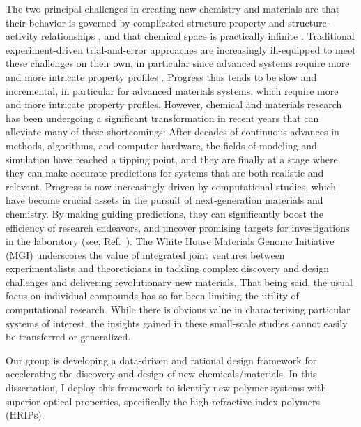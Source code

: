 The two principal challenges in creating new chemistry and materials are that their behavior is governed by complicated structure-property and structure-activity relationships \cite{Selassie2003,Muller2005,LeBaillydeTilleghem2007}, and that chemical space is practically infinite \cite{Lipinski2004,Kirkpatrick2004,Dobson2004}. 
Traditional experiment-driven trial-and-error approaches are increasingly ill-equipped to meet these challenges on their own, in particular since advanced systems require more and more intricate property profiles \cite{Zvinavashe2008,Scior:2009-11,Schneider2010}. 
Progress thus tends to be slow and incremental, in particular for advanced materials systems, which require more and more intricate property profiles. However, chemical and materials research has been undergoing a significant transformation in recent years that can alleviate many of these shortcomings: After decades of continuous advances in methods, algorithms, and computer hardware, the fields of modeling and simulation have reached a tipping point, and they are finally at a stage where they can make accurate predictions for systems that are both realistic and relevant. Progress is now increasingly driven by computational studies, which have become crucial assets in the pursuit of next-generation materials and chemistry. By making guiding predictions, they can significantly boost the efficiency of research endeavors, and uncover promising targets for investigations in the laboratory (see, \eg  Ref.\ \cite{cep01,Sokolov2011,Hachmann2011,Olivares-Amaya2011,Amador-Bedolla2013,Hachmann2014,Pyzer-Knapp2015,Lopez2016}). The White House Materials Genome Initiative (MGI) \cite{NationalMaterials2011} underscores the value of integrated joint ventures between experimentalists and theoreticians in tackling complex discovery and design challenges and delivering revolutionary new materials. That being said, the usual focus on individual compounds has so far been limiting the utility of computational research. While there is obvious value in characterizing particular systems of interest, the insights gained in these small-scale studies cannot easily be transferred or generalized.

Our group is developing a data-driven and rational design framework for accelerating the discovery and design of new chemicals/materials. In this dissertation, I deploy this framework to identify new polymer systems with superior optical properties, specifically the high-refractive-index polymers (HRIPs).



